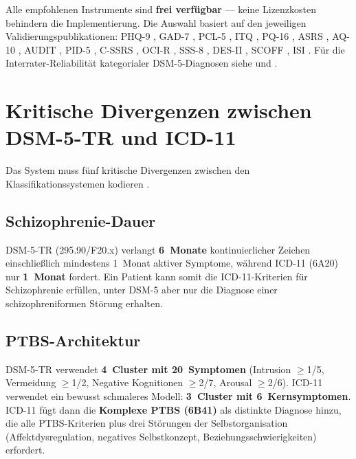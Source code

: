 \documentclass[11pt,a4paper]{article}
\begin{document}
Alle empfohlenen Instrumente sind \textbf{frei verf\"ugbar} --- keine Lizenzkosten behindern die Implementierung. Die Auswahl basiert auf den jeweiligen Validierungspublikationen: PHQ-9 \citep{Levis2019}, GAD-7 \citep{Spitzer2006}, PCL-5 \citep{Blevins2015}, ITQ \citep{Cloitre2018}, PQ-16 \citep{Ising2012}, ASRS \citep{Kessler2005}, AQ-10 \citep{Allison2012}, AUDIT \citep{Saunders1993}, PID-5 \citep{OltmannsWidiger2018, Riegel2021}, C-SSRS \citep{Posner2011}, OCI-R \citep{Foa2002}, SSS-8 \citep{Gierk2014}, DES-II \citep{CarlsonPutnam1993}, SCOFF \citep{Morgan1999}, ISI \citep{Morin2011}. F\"ur die Interrater-Reliabilit\"at kategorialer DSM-5-Diagnosen siehe \citet{Regier2013} und \citet{Aboraya2006}.


\section{Kritische Divergenzen zwischen DSM-5-TR und ICD-11}
\label{sec:divergenzen}

Das System muss f\"unf kritische Divergenzen zwischen den Klassifikationssystemen kodieren \citep{Keeley2016}.

\subsection{Schizophrenie-Dauer}

DSM-5-TR (295.90/F20.x) verlangt \textbf{6~Monate} kontinuierlicher Zeichen einschlie\ss{}lich mindestens 1~Monat aktiver Symptome, w\"ahrend ICD-11 (6A20) nur \textbf{1~Monat} fordert. Ein Patient kann somit die ICD-11-Kriterien f\"ur Schizophrenie erf\"ullen, unter DSM-5 aber nur die Diagnose einer schizophreniformen St\"orung erhalten.

\subsection{PTBS-Architektur}

DSM-5-TR verwendet \textbf{4~Cluster mit 20~Symptomen} (Intrusion $\geq$1/5, Vermeidung $\geq$1/2, Negative Kognitionen $\geq$2/7, Arousal $\geq$2/6). ICD-11 verwendet ein bewusst schmaleres Modell: \textbf{3~Cluster mit 6~Kernsymptomen}. ICD-11 f\"ugt dann die \textbf{Komplexe PTBS (6B41)} als distinkte Diagnose hinzu, die alle PTBS-Kriterien plus drei St\"orungen der Selbstorganisation (Affektdysregulation, negatives Selbstkonzept, Beziehungsschwierigkeiten) erfordert.
\end{document}
